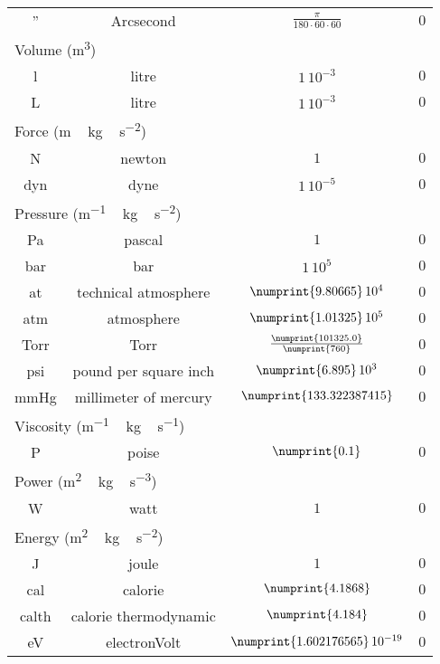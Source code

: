 \begin{longtable}{cccc}
''  & Arcsecond &  $\frac{\pi}{180 \cdot 60 \cdot 60}$ & $0$ \\[5pt]
\multicolumn{4}{l}{\textsf{Volume} (\unit{m^3})} \\\cmidrule(rl){1-2}
l  &  litre  & $1\,10^{-3}$ & $0$ \\
L  &  litre  & $1\,10^{-3}$ & $0$ \\[5pt]
\multicolumn{4}{l}{Force (\unit{m\,kg\,s^{-2}})} \\\cmidrule(rl){1-2}
N   & newton & $1$          & $0$ \\
dyn & dyne   & $1\,10^{-5}$ & $0$ \\[5pt]
\multicolumn{4}{l}{\textsf{Pressure} (\unit{m^{-1}\,kg\,s^{-2}})} \\\cmidrule(rl){1-2}
Pa   & pascal                 & $1$                                          & $0$ \\
bar  & bar                    & $1\,10^5$                                    & $0$ \\
at   & technical atmosphere   & $\numprint{9.80665}\,10^4$                   & $0$ \\
atm  & atmosphere             & $\numprint{1.01325}\,10^5$                   & $0$ \\
Torr & Torr                   & $\frac{\numprint{101325.0}}{\numprint{760}}$ & $0$ \\
psi  & pound per square inch  & $\numprint{6.895}\,10^3$                     & $0$ \\
mmHg & millimeter of mercury  & $\numprint{133.322387415}$                   & $0$ \\[5pt]
\multicolumn{4}{l}{\textsf{Viscosity} (\unit{m^{-1}\,kg\,s^{-1}})} \\\cmidrule(rl){1-2}
P & poise & $\numprint{0.1}$ & $0$ \\[5pt]
\multicolumn{4}{l}{\textsf{Power} (\unit{m^{2}\,kg\,s^{-3}})} \\\cmidrule(rl){1-2}
W & watt & $1$ & $0$ \\[5pt]
\multicolumn{4}{l}{\textsf{Energy} (\unit{m^{2}\,kg\,s^{-2}})} \\\cmidrule(rl){1-2}
J     & joule                 & $1$                                & $0$ \\
cal   & calorie               & $\numprint{4.1868}$                & $0$ \\
calth & calorie thermodynamic & $\numprint{4.184}$                 & $0$ \\
eV    & electronVolt          & $\numprint{1.602176565}\,10^{-19}$ & $0$ \\

\end{longtable}
